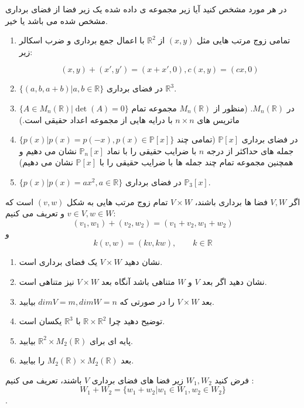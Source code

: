 \documentclass{article}
\begin{document}

در هر مورد مشخص کنید آیا زیر مجموعه ی داده شده یک زیر فضا از فضای برداری مشخص شده می باشد یا خیر.
\begin{enumerate}
	\item 
	تمامی زوج مرتب هایی مثل
	$(x,y)$
	از 
	$\mathbb{R}^2$
	با اعمال جمع برداری و ضرب اسکالر زیر:
	
	$$(x,y)+(x',y')=(x+x',0),c(x,y)=(cx,0)$$
	\item
	$\{(a,b,a+b)|a,b\in \mathbb{R}  \}$
	در فضای برداری 
	$\mathbb{R}^3$.
	\item
	$\{A\in M_n(\mathbb{R})|\det(A)=0\}$
	در
	$M_n(\mathbb{R})$.
	(منظور از 
	$M_n(\mathbb{R})$
	مجموعه تمام ماتریس های 
	$n\times n$
	با درایه هایی از مجموعه اعداد حقیقی است.)
	
	\item 
	$\{p(x)|p(x)=p(-x),p(x)\in\mathbb{P} [x]  \}$
	در فضای برداری 
	$\mathbb{P}[x]$
	(تمامی چند جمله های حداکثر از درجه 
	$n$
	با ضرایب حقیقی را با نماد  
	$\mathbb{P}_n[x]$
	نشان می دهیم و همچنین مجموعه تمام چند جمله ها با ضرایب حقیقی را با  
	$\mathbb{P}[x]$
	نشان می دهیم) 
	\item 
	$\{p(x)|p(x)=ax^2,a\in\mathbb{R}\}$
	در فضای برداری 
	$\mathbb{P}_3[x]$.
	
\end{enumerate}

اگر 
$V,W$
فضا ها برداری باشند،
$V\times W$
تمام زوج مرتب هایی به شکل 
$(v,w)$
است که 
$v\in V,w\in W$
و تعریف می کنیم:
$$(v_1,w_1)+(v_2,w_2)=(v_1+v_2,w_1+w_2)$$
و 
$$k(v,w)=(kv,kw),\qquad k\in \mathbb{R}$$
\begin{enumerate}
\item 	
	نشان دهید 
	$V\times W$
	یک فضای برداری است.
	\item  
	نشان دهید اگر بعد 
	$V$
	و
	$W$
	متناهی باشد آنگاه بعد 
	$V\times W$
	نیز متناهی است.
	\item 
	بعد 
	$V\times W$
	را در صورتی که 
	$dimV=m,dimW=n$
	بیابید.
	\item 
	توضیح دهید چرا 
	$\mathbb{R}\times \mathbb{R}^2$
	با 
	$\mathbb{R}^3$
	یکسان است.
	\item 
	پایه ای برای 
	$\mathbb{R}^2\times M_2(\mathbb{R})$
	بیابید.
	\item 
	بعد 
	$M_2(\mathbb{R})\times M_2(\mathbb{R})$
	را بیابید.
\end{enumerate}
فرض کنید 
$W_1,W_2$
زیر فضا های فضای برداری 
$V$
باشند، تعریف می کنیم :
$$W_1+W_2=\{w_1+w_2|w_1\in W_1,w_2\in W_2\}$$.
\end{document}
